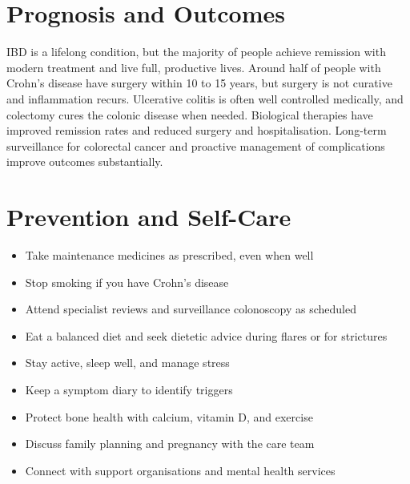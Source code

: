 \section*{Prognosis and Outcomes}
IBD is a lifelong condition, but the majority of people achieve remission with modern treatment and live full, productive lives. Around half of people with Crohn's disease have surgery within 10 to 15 years, but surgery is not curative and inflammation recurs. Ulcerative colitis is often well controlled medically, and colectomy cures the colonic disease when needed. Biological therapies have improved remission rates and reduced surgery and hospitalisation. Long-term surveillance for colorectal cancer and proactive management of complications improve outcomes substantially.

\section*{Prevention and Self-Care}
\begin{itemize}
    \item Take maintenance medicines as prescribed, even when well
    \item Stop smoking if you have Crohn's disease
    \item Attend specialist reviews and surveillance colonoscopy as scheduled
    \item Eat a balanced diet and seek dietetic advice during flares or for strictures
    \item Stay active, sleep well, and manage stress
    \item Keep a symptom diary to identify triggers
    \item Protect bone health with calcium, vitamin D, and exercise
    \item Discuss family planning and pregnancy with the care team
    \item Connect with support organisations and mental health services
\end{itemize}

